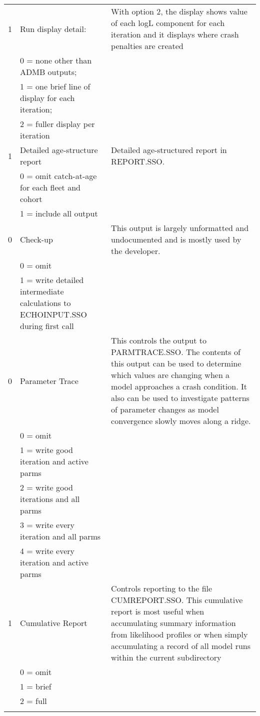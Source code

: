\begin{landscape}
\begin{longtable}{p{3cm} p{7cm} p{11cm}}
 \hline
 1 & Run display detail: &  \multirow{1}{1cm}[-0.1cm]{\parbox{11cm}{With option 2, the display shows value of each logL component for each iteration and it displays where crash penalties are created}} \\
   & 0 = none other than ADMB outputs; & \\
   & 1 = one brief line of display for each iteration; & \\
   & 2 = fuller display per iteration & \\
		  
 \hline
 1 & Detailed age-structure report & \multirow{1}{1cm}[-0.1cm]{\parbox{11cm}{Detailed age-structured report in REPORT.SSO.}} \\
   & 0 = omit catch-at-age for each fleet and cohort & \\
   & 1 = include all output &  \\
		  
 \hline
 0 & Check-up & \multirow{1}{1cm}[-0.1cm]{\parbox{11cm}{This output is largely unformatted and undocumented and is mostly used by the developer. }}\\
   & 0 = omit & \\
   & 1 = write detailed intermediate calculations to ECHOINPUT.SSO during first call & \\

 \pagebreak		
 0 & Parameter Trace & \multirow{1}{1cm}[-0.1cm]{\parbox{11cm}{This controls the output to PARMTRACE.SSO. The contents of this output can be used to determine which values are changing when a model approaches a crash condition.  It also can be used to investigate patterns of parameter changes as model convergence slowly moves along a ridge.}} \\
   & 0 = omit & \\
   & 1 = write good iteration and active parms & \\
   & 2 = write good iterations and all parms & \\
   & 3 = write every iteration and all parms & \\
   & 4 = write every iteration and active parms &  \\
   
 \hline
 1 & Cumulative Report & \multirow{1}{1cm}[-0.1cm]{\parbox{11cm}{Controls reporting to the file CUMREPORT.SSO.
 		This cumulative report is most useful when accumulating summary information from likelihood profiles or when simply accumulating a record of all model runs within the current subdirectory}}\\
   & 0 = omit  & \\
   & 1 = brief & \\
   & 2 = full  &  \\
   & & \\
	 

\end{longtable}
\end{landscape}
